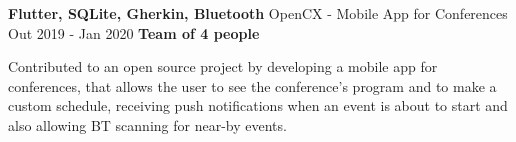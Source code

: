 \cventry
  {\textbf{Flutter, SQLite, Gherkin, Bluetooth}} %
  {OpenCX - Mobile App for Conferences \href{https://github.com/open-cx/open-cx}{\faExternalLink}} %
  {Out 2019 - Jan 2020} %
  {\textbf{Team of 4 people}} %
  {
    \begin{cvitems} %
      \item {Contributed to an open source project by developing a mobile app for conferences, that allows the user to see the conference's program and to make a custom schedule, receiving push notifications when an event is about to start and also allowing BT scanning for near-by events.}
    \end{cvitems}
  }